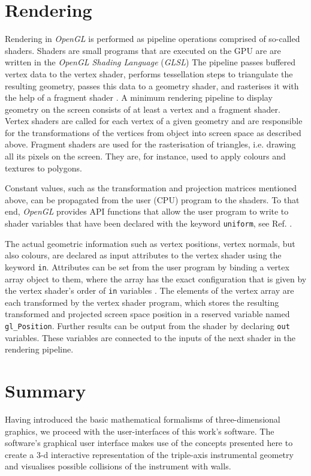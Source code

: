\section{Rendering}
\label{sec:gl_shaders}
Rendering in \textit{OpenGL} is performed as pipeline operations comprised of so-called shaders.
Shaders are small programs that are executed on the GPU are are written in the
\textit{OpenGL Shading Language} (\textit{GLSL}) \cite{wiki_glsl}
The pipeline passes buffered vertex data to the vertex shader, performs tessellation steps to triangulate
the resulting geometry, passes this data to a geometry shader, and rasterises it with the help
of a fragment shader \cite[p. 6]{Sellers2002}.
A minimum rendering pipeline to display geometry on the screen consists of at least a vertex and
a fragment shader.
Vertex shaders are called for each vertex of a given geometry and are responsible for the transformations
of the vertices from object into screen space as described above.
Fragment shaders are used for the rasterisation of triangles, i.e. drawing all its pixels on the screen. 
They are, for instance, used to apply colours and textures to polygons.

Constant values, such as the transformation and projection matrices mentioned above, can be propagated from the 
user (CPU) program to the shaders. To that end, \textit{OpenGL} provides API functions that allow the user 
program to write to shader variables that have been declared with the keyword \lstinline[language=C]|uniform|,
see Ref. \cite[pp. 103-126]{Sellers2002}.

The actual geometric information such as vertex positions, vertex normals, but also colours, are declared as
input attributes to the vertex shader using the keyword \lstinline[language=C]|in|.
Attributes can be set from the user program by binding a vertex array object \cite{wiki_vao} to them,
where the array has the exact configuration that is given by the vertex shader's order of \lstinline[language=C]|in|
variables \cite[pp. 97-102]{Sellers2002}.
The elements of the vertex array are each transformed by the vertex shader program, which stores the resulting 
transformed and projected screen space position in a reserved variable named \lstinline[language=C]|gl_Position|.
Further results can be output from the shader by declaring \lstinline[language=C]|out| variables.
These variables are connected to the inputs of the next shader in the rendering pipeline.



\section{Summary}
Having introduced the basic mathematical formalisms of three-dimensional graphics, we proceed
with the user-interfaces of this work's software. The software's graphical user interface makes use of the 
concepts presented here to create a 3-d interactive representation of the triple-axis instrumental geometry
and visualises possible collisions of the instrument with walls.
